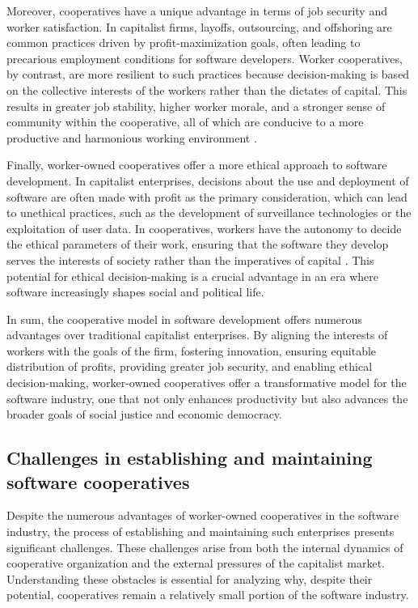 \begin{refsection}
Moreover, cooperatives have a unique advantage in terms of job security and worker satisfaction. In capitalist firms, layoffs, outsourcing, and offshoring are common practices driven by profit-maximization goals, often leading to precarious employment conditions for software developers. Worker cooperatives, by contrast, are more resilient to such practices because decision-making is based on the collective interests of the workers rather than the dictates of capital. This results in greater job stability, higher worker morale, and a stronger sense of community within the cooperative, all of which are conducive to a more productive and harmonious working environment \cite[pp.~101-103]{schweickart2002}.

Finally, worker-owned cooperatives offer a more ethical approach to software development. In capitalist enterprises, decisions about the use and deployment of software are often made with profit as the primary consideration, which can lead to unethical practices, such as the development of surveillance technologies or the exploitation of user data. In cooperatives, workers have the autonomy to decide the ethical parameters of their work, ensuring that the software they develop serves the interests of society rather than the imperatives of capital \cite[pp.~77-79]{benkler2006}. This potential for ethical decision-making is a crucial advantage in an era where software increasingly shapes social and political life.

In sum, the cooperative model in software development offers numerous advantages over traditional capitalist enterprises. By aligning the interests of workers with the goals of the firm, fostering innovation, ensuring equitable distribution of profits, providing greater job security, and enabling ethical decision-making, worker-owned cooperatives offer a transformative model for the software industry, one that not only enhances productivity but also advances the broader goals of social justice and economic democracy.

\subsection{Challenges in establishing and maintaining software cooperatives}

Despite the numerous advantages of worker-owned cooperatives in the software industry, the process of establishing and maintaining such enterprises presents significant challenges. These challenges arise from both the internal dynamics of cooperative organization and the external pressures of the capitalist market. Understanding these obstacles is essential for analyzing why, despite their potential, cooperatives remain a relatively small portion of the software industry.


\end{refsection}
